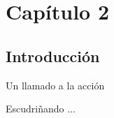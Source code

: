 \chapter{Capítulo 2}

\section{Introducción}


\begin{paperbox}{Un llamado a la acción}

\end{paperbox}


\begin{monsterbox}{Escudriñando ... }
  \hline%

  \hline%

  \vspace{5mm}
\end{monsterbox}
